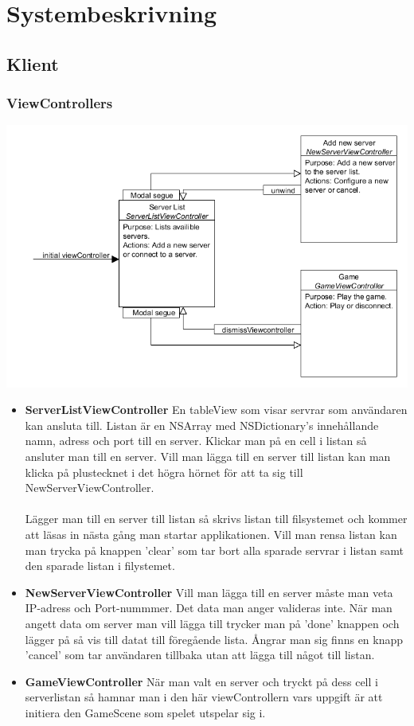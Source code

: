 \documentclass[10pt, titlepage, oneside, a4paper]{article}
\begin{document}
    \newpage
    \section{Systembeskrivning}
    	\subsection{Klient}
    		\subsubsection{ViewControllers}
    		\includegraphics[scale=.4]{./png/StoryBoard.png}
    		\begin{itemize}
    			\item\textbf{ServerListViewController}
    			En tableView som visar servrar som användaren kan ansluta till. Listan är en NSArray med NSDictionary's innehållande namn, adress och port till en server. Klickar man på en cell i listan så ansluter man till en server. Vill man lägga till en server till listan kan man klicka på plustecknet i det högra hörnet för att ta sig till NewServerViewController.\\\\Lägger man till en server till listan så skrivs listan till filsystemet och kommer att läsas in nästa gång man startar applikationen. Vill man rensa listan kan man trycka på knappen 'clear' som tar bort alla sparade servrar i listan samt den sparade listan i filystemet.
    			
    			\item\textbf{NewServerViewController}
    			Vill man lägga till en server måste man veta IP-adress och Port-nummmer. Det data man anger valideras inte. När man angett data om server man vill lägga till trycker man på 'done' knappen och lägger på så vis till datat till föregående lista. Ångrar man sig finns en knapp 'cancel' som tar användaren tillbaka utan att lägga till något till listan.
    			
    			\item\textbf{GameViewController}
    			När man valt en server och tryckt på dess cell i serverlistan så hamnar man i den här viewControllern vars uppgift är att initiera den GameScene som spelet utspelar sig i. 
    		\end{itemize}
    		
\end{document}
